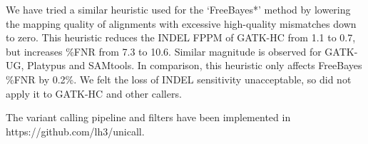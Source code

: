 \documentclass{bioinfo}
\begin{document}
\begin{methods}
We have tried a similar heuristic used for the `FreeBayes*' method by lowering
the mapping quality of alignments with excessive high-quality mismatches down
to zero. This heuristic reduces the INDEL FPPM of GATK-HC from 1.1 to 0.7, but
increases \%FNR from 7.3 to 10.6. Similar magnitude is observed for GATK-UG,
Platypus and SAMtools. In comparison, this heuristic only affects FreeBayes
\%FNR by 0.2\%. We felt the loss of INDEL sensitivity unacceptable, so did not
apply it to GATK-HC and other callers.

The variant calling pipeline and filters have been implemented in
https://github.com/lh3/unicall.

\end{methods}
\end{document}
